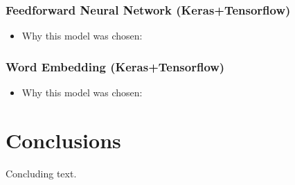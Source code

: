 \documentclass[11pt]{article}
\begin{document}
\subsubsection{Feedforward Neural Network (Keras+Tensorflow)}
\begin{itemize}
\item Why this model was chosen:
\end{itemize}

\subsubsection{Word Embedding (Keras+Tensorflow)}
\begin{itemize}
\item Why this model was chosen:
\end{itemize}


\section{Conclusions}

Concluding text.



\end{document}
